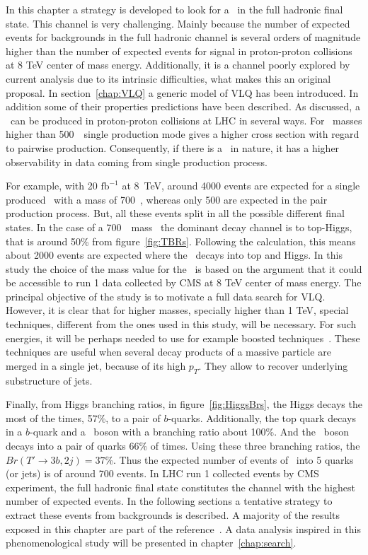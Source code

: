 In this chapter a strategy is developed to look for a \Tp~in the full hadronic final state. This channel is very challenging. Mainly because the number of expected events for backgrounds in the full hadronic channel is several orders of magnitude higher than the number of expected events for signal in proton-proton collisions at 8 TeV center of mass energy. Additionally, it is a channel poorly explored by current analysis due to its intrinsic difficulties, what makes this an original proposal. In section~\ref{chap:VLQ} a generic model of VLQ has been introduced. In addition some of their properties predictions have been described. As discussed, a \Tp~can be produced in proton-proton collisions at LHC in several ways. For \Tp~masses higher than 500~\GeVcc~single production mode gives a higher cross section with regard to pairwise production. Consequently, if there is a \Tp~in nature, it has a higher observability in data coming from single production process. 

For example, with 20 $\text{fb}^{-1}$ at 8~TeV, around 4000 events are expected for a single produced \Tp~with a mass of 700~\GeVcc, whereas only 500 are expected in the pair production process. But, all these events split in all the possible different final states. In the case of a 700~\GeVcc~mass \Tp~the dominant decay channel is to top-Higgs, that is around 50\% from figure~\ref{fig:TBRs}. Following the calculation, this means about 2000 events are expected where the \Tp~decays into top and Higgs. In this study the choice of the mass value for the \Tp~is based on the argument that it could be accessible to run 1 data collected by CMS at 8 TeV center of mass energy. The principal objective of the study is to motivate a full data search for VLQ. However, it is clear that for higher masses, specially higher than 1 TeV, special techniques, different from the ones used in this study, will be necessary. For such energies, it will be perhaps needed to use for example boosted techniques~\cite{CMS:2013vca, ATLAS-CONF-2013-084, Usai:2015vva}. These techniques are useful when several decay products of a massive particle are merged in a single jet, because of its high $p_{T}$. They allow to recover underlying substructure of jets.

Finally, from Higgs branching ratios, in figure~\ref{fig:HiggsBrs}, the Higgs decays the most of the times, 57\%, to a pair of $b$-quarks. Additionally, the top quark decays in a $b$-quark and a \W~boson with a branching ratio about 100\%. And the \W~boson decays into a pair of quarks 66\% of times. Using these three branching ratios, the $Br(T'\to 3b, 2j)=37$\%. Thus the expected number of events of \Tp~into 5 quarks (or jets) is of around 700 events. In LHC run 1 collected events by CMS experiment, the full hadronic final state constitutes the channel with the highest number of expected events. In the following sections a tentative strategy to extract these events from backgrounds is described. A majority of the results exposed in this chapter are part of the reference~\cite{Beauceron:2014ila}. A data analysis inspired in this phenomenological study will be presented in chapter~\ref{chap:search}. %

